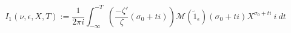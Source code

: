 \begin{definition}[I₁]
\label{I1}
\leanok
$$
  I_1(\nu, \epsilon, X, T) := \frac{1}{2\pi i} \int_{-\infty}^{-T}
  \left(
  \frac{-\zeta'}\zeta(\sigma_0 + t i)
  \right)
   \mathcal M(\widetilde 1_\epsilon)(\sigma_0 + t i)
  X^{\sigma_0 + t i}
  \ i \ dt
  $$
\end{definition}
